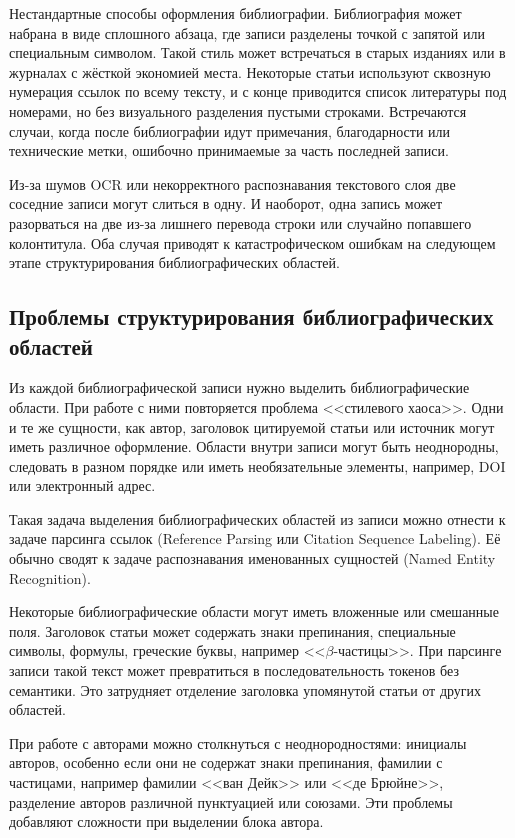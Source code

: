 Нестандартные способы оформления библиографии. Библиография может набрана в виде сплошного абзаца, где записи разделены точкой с запятой или специальным символом. Такой стиль может встречаться в старых изданиях или в журналах с жёсткой экономией места. Некоторые статьи используют сквозную нумерация ссылок по всему тексту, и с конце приводится список литературы под номерами, но без визуального разделения пустыми строками. Встречаются случаи, когда после библиографии идут примечания, благодарности или технические метки, ошибочно принимаемые за часть последней записи\cite{di2026tool}.

Из-за шумов OCR или некорректного распознавания текстового слоя две соседние записи могут слиться в одну. И наоборот, одна запись может разорваться на две из-за лишнего перевода строки или случайно попавшего колонтитула. Оба случая приводят к катастрофическом ошибкам на следующем этапе структурирования библиографических областей. 

\subsection{Проблемы структурирования библиографических областей}
Из каждой библиографической записи нужно выделить библиографические области. При работе с ними повторяется проблема <<стилевого хаоса>>. Одни и те же сущности, как автор, заголовок цитируемой статьи или источник могут иметь различное оформление. Области внутри записи могут быть неоднородны, следовать в разном порядке или иметь необязательные элементы, например, DOI или электронный адрес\cite{zhu2026benchmarking}.

Такая задача выделения библиографических областей из записи можно отнести к задаче парсинга ссылок (Reference Parsing или Citation Sequence Labeling). Её обычно сводят к задаче распознавания именованных сущностей (Named Entity Recognition)\cite{romary2015grobid}.

Некоторые библиографические области могут иметь вложенные или смешанные поля. Заголовок статьи может содержать знаки препинания, специальные символы, формулы, греческие буквы, например <<$\beta$-частицы>>. При парсинге записи такой текст может превратиться в последовательность токенов без семантики. Это затрудняет отделение заголовка упомянутой статьи от других областей. 

При работе с авторами можно столкнуться с неоднородностями: инициалы авторов, особенно если они не содержат знаки препинания, фамилии с частицами, например фамилии <<ван Дейк>> или <<де Брюйне>>, разделение авторов различной пунктуацией или союзами. Эти проблемы добавляют сложности при выделении блока автора.

